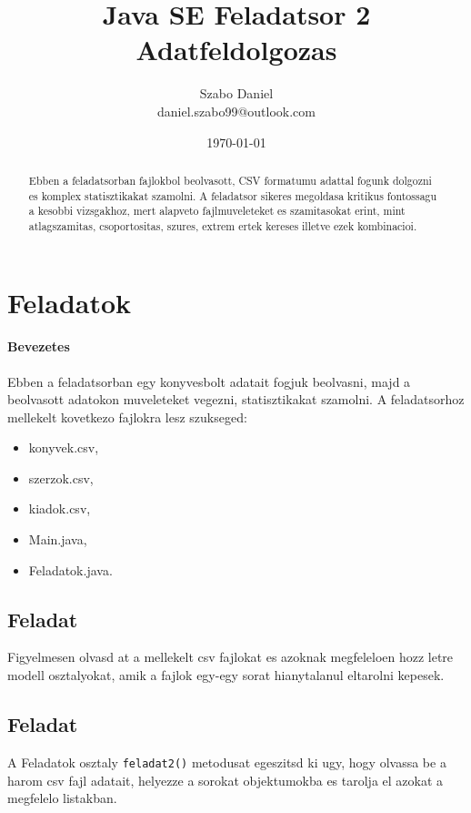\documentclass{article}
\title{%
Java SE Feladatsor 2 \\
\large Adatfeldolgozas}
\author{Szabo Daniel\\daniel.szabo99@outlook.com}
\date{\today}
\let\l\lstinline
\begin{document}
\maketitle
\begin{abstract}
Ebben a feladatsorban fajlokbol beolvasott, CSV formatumu adattal fogunk dolgozni es komplex statisztikakat szamolni. A feladatsor sikeres megoldasa kritikus fontossagu a kesobbi vizsgakhoz, mert alapveto fajlmuveleteket es szamitasokat erint, mint atlagszamitas, csoportositas, szures, extrem ertek kereses illetve ezek kombinacioi.
\end{abstract}

\newpage

\tableofcontents{}

\newpage

\section{Feladatok}

\paragraph{Bevezetes}

Ebben a feladatsorban egy konyvesbolt adatait fogjuk beolvasni, majd a beolvasott adatokon muveleteket vegezni, statisztikakat szamolni. A feladatsorhoz mellekelt kovetkezo fajlokra lesz szukseged: \newline
\begin{itemize}
    \item konyvek.csv,
    \item szerzok.csv,
    \item kiadok.csv,
    \item Main.java,
    \item Feladatok.java.
\end{itemize}


\subsection{Feladat}
Figyelmesen olvasd at a mellekelt csv fajlokat es azoknak megfeleloen hozz letre modell osztalyokat, amik a fajlok egy-egy sorat hianytalanul eltarolni kepesek.

\subsection{Feladat}
A Feladatok osztaly \l{feladat2()} metodusat egeszitsd ki ugy, hogy olvassa be a harom csv fajl adatait, helyezze a sorokat objektumokba es tarolja el azokat a megfelelo listakban.
\end{document}
